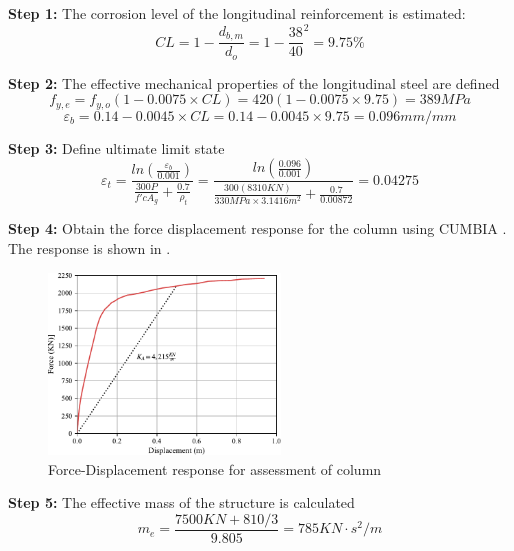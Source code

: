 \textbf{Step 1:} The corrosion level of the longitudinal reinforcement is estimated:
\begin{displaymath}
    CL=1-\frac{d_{b,m}}{d_{o}}=1-\frac{38}{40}^2=9.75\%
\end{displaymath}

\textbf{Step 2:} The effective mechanical properties of the longitudinal steel are defined
\begin{displaymath}
    f_{y,e}=f_{y,o}(1-0.0075\times CL)=420(1-0.0075\times 9.75)=389 MPa
\end{displaymath}
\begin{displaymath}
    \varepsilon_{b}=0.14-0.0045 \times CL = 0.14-0.0045 \times 9.75 = 0.096 mm/mm
\end{displaymath}

\textbf{Step 3:} Define ultimate limit state
\begin{displaymath}
    \varepsilon_{t}=\frac{ln(\frac{\varepsilon_{b}}{0.001})}{\frac{300P}{f'c A_{g}}+\frac{0.7}{\rho_{t}}}=\frac{ln(\frac{0.096}{0.001})}{\frac{300(8310KN)}{330MPa \times 3.1416 m^2}+\frac{0.7}{0.00872}}=0.04275
\end{displaymath}

\textbf{Step 4:} Obtain the force displacement response for the column using CUMBIA \cite{Montejo2007}. The response is shown in .

\begin{figure}[htbp]
	\centering
	\includegraphics[width=0.55\textwidth]{VAC Thesis 2.0/Chapter-6/figs/Force_Displacement_Assessment_9_75.pdf}
	\caption{Force-Displacement response for assessment of column}
	\label{fig:force_displacement_assessment}
\end{figure}

\textbf{Step 5:} The effective mass of the structure is calculated
\begin{displaymath}
    m_e=\frac{7500 KN + 810/3}{9.805}=785 KN \cdot s^2/m
\end{displaymath}

